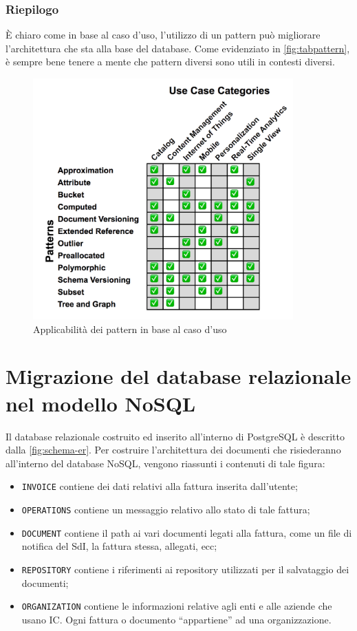 \subsubsection{Riepilogo}
È chiaro come in base al caso d'uso, l'utilizzo di un pattern può migliorare l'architettura che sta alla base del database. Come evidenziato in \autoref{fig:tabpattern}, è sempre bene tenere a mente che pattern diversi sono utili in contesti diversi.

\begin{figure}[htbp]
\begin{center}
\includegraphics[height=25em]{immagini/patterns-table.png}
\caption{Applicabilità dei pattern in base al caso d'uso}
\label{fig:tabpattern}
\end{center}
\end{figure}

\section{Migrazione del database relazionale nel modello NoSQL}
Il database relazionale costruito ed inserito all'interno di PostgreSQL è descritto dalla \autoref{fig:schema-er}. Per costruire l'architettura dei documenti che risiederanno all'interno del database NoSQL, vengono riassunti i contenuti di tale figura:\\
\begin{itemize}
    \item \texttt{INVOICE} contiene dei dati relativi alla fattura inserita dall'utente;
    \item \texttt{OPERATIONS} contiene un messaggio relativo allo stato di tale fattura;
    \item \texttt{DOCUMENT} contiene il path ai vari documenti legati alla fattura, come un file di notifica del SdI, la fattura stessa, allegati, ecc;
    \item \texttt{REPOSITORY} contiene i riferimenti ai repository utilizzati per il salvataggio dei documenti;
    \item \texttt{ORGANIZATION} contiene le informazioni relative agli enti e alle aziende che usano IC. Ogni fattura o documento ``appartiene'' ad una organizzazione.
\end{itemize}

